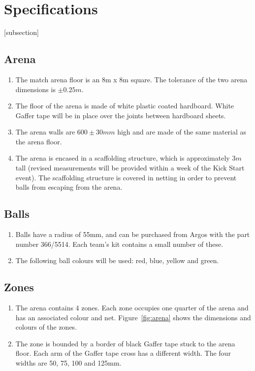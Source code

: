 \section{Specifications}
[subsection]
\newcommand{\rcnii}{\stepcounter{rulei}\arabic{section}.\arabic{subsection}.\arabic{rulei}}
\renewcommand{\labelenumi}{\rcnii}

\subsection{Arena}
\begin{enumerate}
\item The match arena floor is an 8m x 8m square.  The tolerance of the two arena dimensions is $\pm0.25m$.
\item The floor of the arena is made of white plastic coated hardboard.  White Gaffer tape will be in place over the joints between hardboard sheets.
\item The arena walls are $600\pm30mm$ high and are made of the same material as the arena floor.
\item The arena is encased in a scaffolding structure, which is approximately $3m$ tall (revised measurements will be provided within a week of the Kick Start event).  The scaffolding structure is covered in netting in order to prevent balls from escaping from the arena.
\end{enumerate}

\subsection{Balls}
\label{balls}
\begin {enumerate} 
\item Balls have a radius of 55mm, and can be purchased from Argos with the part number 366/5514.  Each team's kit contains a small number of these.
\item The following ball colours will be used: red, blue, yellow and green.
\end {enumerate}

\subsection{Zones}
\begin {enumerate}
\item The arena contains 4 zones.  Each zone occupies one quarter of the arena and has an associated colour and net.  Figure~\ref{fig:arena} shows the dimensions and colours of the zones.
\item The zone is bounded by a border of black Gaffer tape stuck to the arena floor.  Each arm of the Gaffer tape cross has a different width.  The four widths are 50, 75, 100 and 125mm.
\end {enumerate}

